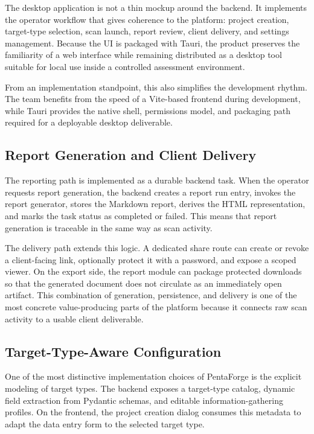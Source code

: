 \documentclass[12pt,a4paper]{report}
\begin{document}
The desktop application is not a thin mockup around the backend. It implements the
operator workflow that gives coherence to the platform: project creation, target-type
selection, scan launch, report review, client delivery, and settings management.
Because the UI is packaged with Tauri, the product preserves the familiarity of a web
interface while remaining distributed as a desktop tool suitable for local use inside
a controlled assessment environment.

From an implementation standpoint, this also simplifies the development rhythm. The
team benefits from the speed of a Vite-based frontend during development, while Tauri
provides the native shell, permissions model, and packaging path required for a
deployable desktop deliverable.

\subsection{Report Generation and Client Delivery}

The reporting path is implemented as a durable backend task. When the operator
requests report generation, the backend creates a report run entry, invokes the
report generator, stores the Markdown report, derives the HTML representation, and
marks the task status as completed or failed. This means that report generation is
traceable in the same way as scan activity.

The delivery path extends this logic. A dedicated share route can create or revoke a
client-facing link, optionally protect it with a password, and expose a scoped
viewer. On the export side, the report module can package protected downloads so that
the generated document does not circulate as an immediately open artifact. This
combination of generation, persistence, and delivery is one of the most concrete
value-producing parts of the platform because it connects raw scan activity to a
usable client deliverable.

\subsection{Target-Type-Aware Configuration}

One of the most distinctive implementation choices of PentaForge is the explicit
modeling of target types. The backend exposes a target-type catalog, dynamic field
extraction from Pydantic schemas, and editable information-gathering profiles. On
the frontend, the project creation dialog consumes this metadata to adapt the data
entry form to the selected target type.
\end{document}
